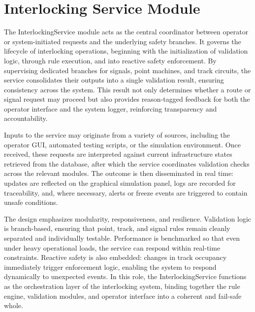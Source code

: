 \section{Interlocking Service Module}
\label{sec:methodology:interlocking-service}

The InterlockingService module acts as the central coordinator between operator or system-initiated requests and the underlying safety branches. It governs the lifecycle of interlocking operations, beginning with the initialization of validation logic, through rule execution, and into reactive safety enforcement. By supervising dedicated branches for signals, point machines, and track circuits, the service consolidates their outputs into a single validation result, ensuring consistency across the system. This result not only determines whether a route or signal request may proceed but also provides reason-tagged feedback for both the operator interface and the system logger, reinforcing transparency and accountability.

Inputs to the service may originate from a variety of sources, including the operator GUI, automated testing scripts, or the simulation environment. Once received, these requests are interpreted against current infrastructure states retrieved from the database, after which the service coordinates validation checks across the relevant modules. The outcome is then disseminated in real time: updates are reflected on the graphical simulation panel, logs are recorded for traceability, and, where necessary, alerts or freeze events are triggered to contain unsafe conditions.

The design emphasizes modularity, responsiveness, and resilience. Validation logic is branch-based, ensuring that point, track, and signal rules remain cleanly separated and individually testable. Performance is benchmarked so that even under heavy operational loads, the service can respond within real-time constraints. Reactive safety is also embedded: changes in track occupancy immediately trigger enforcement logic, enabling the system to respond dynamically to unexpected events. In this role, the InterlockingService functions as the orchestration layer of the interlocking system, binding together the rule engine, validation modules, and operator interface into a coherent and fail-safe whole.